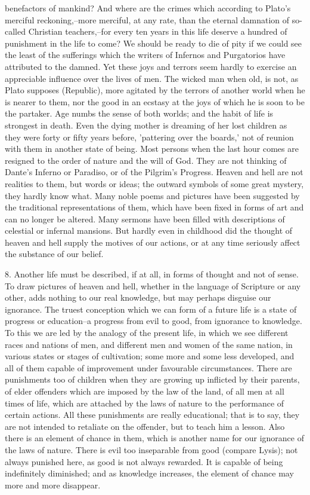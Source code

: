 benefactors of mankind? And where are the crimes which according to
Plato's merciful reckoning,--more merciful, at any rate, than the
eternal damnation of so-called Christian teachers,--for every ten years
in this life deserve a hundred of punishment in the life to come?
We should be ready to die of pity if we could see the least of the
sufferings which the writers of Infernos and Purgatorios have attributed
to the damned. Yet these joys and terrors seem hardly to exercise an
appreciable influence over the lives of men. The wicked man when old,
is not, as Plato supposes (Republic), more agitated by the terrors of
another world when he is nearer to them, nor the good in an ecstasy at
the joys of which he is soon to be the partaker. Age numbs the sense of
both worlds; and the habit of life is strongest in death. Even the dying
mother is dreaming of her lost children as they were forty or fifty
years before, 'pattering over the boards,' not of reunion with them
in another state of being. Most persons when the last hour comes are
resigned to the order of nature and the will of God. They are not
thinking of Dante's Inferno or Paradiso, or of the Pilgrim's Progress.
Heaven and hell are not realities to them, but words or ideas; the
outward symbols of some great mystery, they hardly know what. Many
noble poems and pictures have been suggested by the traditional
representations of them, which have been fixed in forms of art and can
no longer be altered. Many sermons have been filled with descriptions
of celestial or infernal mansions. But hardly even in childhood did the
thought of heaven and hell supply the motives of our actions, or at any
time seriously affect the substance of our belief.

8. Another life must be described, if at all, in forms of thought
and not of sense. To draw pictures of heaven and hell, whether in the
language of Scripture or any other, adds nothing to our real knowledge,
but may perhaps disguise our ignorance. The truest conception which
we can form of a future life is a state of progress or education--a
progress from evil to good, from ignorance to knowledge. To this we are
led by the analogy of the present life, in which we see different races
and nations of men, and different men and women of the same nation,
in various states or stages of cultivation; some more and some less
developed, and all of them capable of improvement under favourable
circumstances. There are punishments too of children when they are
growing up inflicted by their parents, of elder offenders which are
imposed by the law of the land, of all men at all times of life,
which are attached by the laws of nature to the performance of certain
actions. All these punishments are really educational; that is to say,
they are not intended to retaliate on the offender, but to teach him
a lesson. Also there is an element of chance in them, which is another
name for our ignorance of the laws of nature. There is evil too
inseparable from good (compare Lysis); not always punished here, as good
is not always rewarded. It is capable of being indefinitely diminished;
and as knowledge increases, the element of chance may more and more
disappear.

